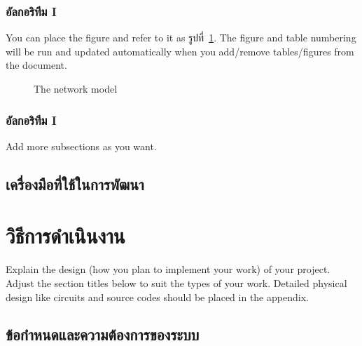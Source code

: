 \documentclass[12pt,oneside,openright,a4paper]{cpe-thai-project}
\begin{document}
\subsection{อัลกอริทึม I}

You can place the figure and refer to it as รูปที่~\ref{fig:model2}.
The figure and table numbering will be run and updated automatically when you add/remove tables/figures from the document.

\begin{figure}[!h]\centering
\setlength{\fboxrule}{0.2mm} %
\setlength{\fboxsep}{1cm}
\caption{The network model}\label{fig:model2}
\end{figure}

 
\subsection{อัลกอริทึม I}
Add more subsections as you want.


\section{เครื่องมือที่ใช้ในการพัฒนา}

\chapter{วิธีการดำเนินงาน}

Explain the design (how you plan to implement your work) of your project. Adjust the section titles below to suit the types of your work. Detailed physical design like circuits and source codes should be placed in the appendix.

\section{ข้อกำหนดและความต้องการของระบบ}
\end{document}
